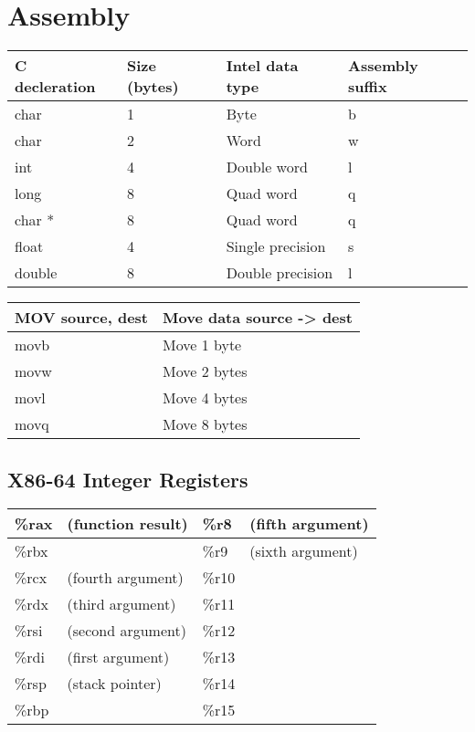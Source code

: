 \section*{Assembly}

\begin{tabular}{| l | l | l | l |}
    \hline
    C decleration & Size (bytes) & Intel data type & Assembly suffix \\
    \hline
    char & 1 & Byte & b \\
    char & 2 & Word & w \\
    int & 4 & Double word & l \\
    long & 8 & Quad word & q \\
    char * & 8 & Quad word & q \\
    float & 4 & Single precision & s \\
    double & 8 & Double precision & l \\
    \hline
\end{tabular}
\newline
\newline

\begin{tabular}{| l | l |}
    \hline
    MOV source, dest & Move data source -> dest \\
    \hline
    movb & Move 1 byte \\
    movw & Move 2 bytes \\
    movl & Move 4 bytes \\
    movq & Move 8 bytes \\
    \hline
\end{tabular}

\subsection{X86-64 Integer Registers}

\begin{tabular}{| l l | l l |}
    \hline 
    \%rax & (function result) & \%r8 & (fifth argument) \\
    \hline
    \%rbx &                  & \%r9 & (sixth argument) \\
    \hline 
    \%rcx & (fourth argument) & \%r10 & \\
    \hline 
    \%rdx & (third argument)  & \%r11 & \\
    \hline 
    \%rsi & (second argument) & \%r12 & \\
    \hline 
    \%rdi & (first argument)  & \%r13 & \\
    \hline 
    \%rsp & (stack pointer)   & \%r14 & \\
    \hline 
    \%rbp &                   & \%r15 & \\
    \hline 
\end{tabular}
